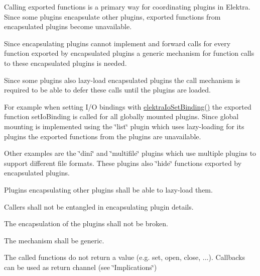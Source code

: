 Calling exported functions is a primary way for coordinating plugins in Elektra. Since some plugins encapsulate other plugins, exported functions from encapsulated plugins become unavailable.

Since encapsulating plugins cannot implement and forward calls for every function exported by encapsulated plugins a generic mechanism for function calls to these encapsulated plugins is needed.

Since some plugins also lazy-\/load encapsulated plugins the call mechanism is required to be able to defer these calls until the plugins are loaded.

For example when setting I/O bindings with {\ttfamily \hyperlink{group__kdbio_ga187345483bdfbb404919c6797bc2db77}{elektra\+Io\+Set\+Binding()}} the exported function {\ttfamily set\+Io\+Binding} is called for all globally mounted plugins. Since global mounting is implemented using the \char`\"{}list\char`\"{} plugin which uses lazy-\/loading for its plugins the exported functions from the plugins are unavailable.

Other examples are the \char`\"{}dini\char`\"{} and \char`\"{}multifile\char`\"{} plugins which use multiple plugins to support different file formats. These plugins also \char`\"{}hide\char`\"{} functions exported by encapsulated plugins.


\begin{DoxyEnumerate}
\item Plugins encapsulating other plugins shall be able to lazy-\/load them.
\item Callers shall not be entangled in encapsulating plugin details.
\item The encapsulation of the plugins shall not be broken.
\item The mechanism shall be generic.
\end{DoxyEnumerate}


\begin{DoxyEnumerate}
\item The called functions do not return a value (e.\+g. {\ttfamily set}, {\ttfamily open}, {\ttfamily close}, ...). Callbacks can be used as return channel (see \char`\"{}\+Implications\char`\"{})
\end{DoxyEnumerate}


